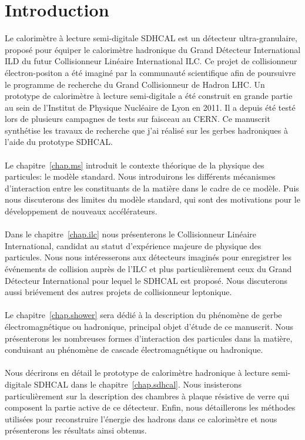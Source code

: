 \chapter*{Introduction}

Le calorimètre à lecture semi-digitale SDHCAL est un détecteur ultra-granulaire, proposé pour équiper le calorimètre hadronique du Grand Détecteur International ILD du futur Collisionneur Linéaire International ILC. Ce projet de collisionneur électron-positon a été imaginé par la communauté scientifique afin de poursuivre le programme de recherche du Grand Collisionneur de Hadron LHC. Un prototype de calorimètre à lecture semi-digitale a été construit en grande partie au sein de l'Institut de Physique Nucléaire de Lyon en 2011. Il a depuis été testé lors de plusieurs campagnes de tests sur faisceau au CERN. Ce manuscrit synthétise les travaux de recherche que j'ai réalisé sur les gerbes hadroniques à l'aide du prototype SDHCAL. 
\\ \\
Le chapitre~\ref{chap.ms} introduit le contexte théorique de la physique des particules: le modèle standard. Nous introduirons les différents mécanismes d'interaction entre les constituants de la matière dans le cadre de ce modèle. Puis nous discuterons des limites du modèle standard, qui sont des motivations pour le développement de nouveaux accélérateurs.
\\ \\
Dans le chapitre~\ref{chap.ilc} nous présenterons le Collisionneur Linéaire International, candidat au statut d'expérience majeure de physique des particules. Nous nous intéresserons aux détecteurs imaginés pour enregistrer les événements de collision auprès de l'ILC et plus particulièrement ceux du Grand Détecteur International pour lequel le SDHCAL est proposé. Nous discuterons aussi briévement des autres projets de collisionneur leptonique.
\\ \\
Le chapitre~\ref{chap.shower} sera dédié à la description du phénomène de gerbe électromagnétique ou hadronique, principal objet d'étude de ce manuscrit. Nous présenterons les nombreuses formes d'interaction des particules dans la matière, conduisant au phénomène de cascade électromagnétique ou hadronique.
\\ \\
Nous décrirons en détail le prototype de calorimètre hadronique à lecture semi-digitale SDHCAL dans le chapitre~\ref{chap.sdhcal}. Nous insisterons particulièrement sur la description des chambres à plaque résistive de verre qui composent la partie active de ce détecteur. Enfin, nous détaillerons les méthodes utilisées pour reconstruire l'énergie des hadrons dans ce calorimètre et nous présenterons les résultats ainsi obtenus.
